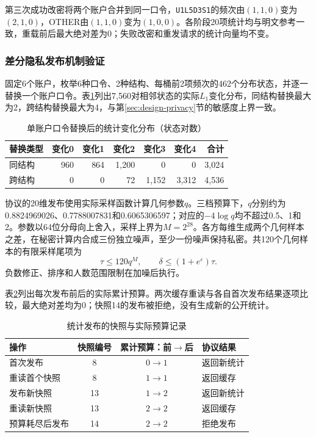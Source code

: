 \documentclass{crypto_report}
\begin{document}
第三次成功改密将两个账户合并到同一口令，\texttt{U1L5D3S1}的频次由$(1,1,0)$变为$(2,1,0)$，OTHER由$(1,1,0)$变为$(1,0,0)$。各阶段20项统计均与明文参考一致，重载前后最大绝对差为0；失败改密和重发请求的统计向量均不变。

\subsubsection{差分隐私发布机制验证}\label{sec:validation-privacy-4}

固定6个账户，枚举6种口令、2种结构、每桶前2项频次的462个分布状态，并逐一替换一个账户口令。表\ref{tab:privacy-sensitivity-values}列出7,560对相邻状态的实际$L_1$变化分布，同结构替换最大为2，跨结构替换最大为4，与第\ref{sec:design-privacy}节的敏感度上界一致。

\begin{table}[H]
\centering
\caption{单账户口令替换后的统计变化分布（状态对数）}\label{tab:privacy-sensitivity-values}
\small
\begin{tabular}{@{}lrrrrrr@{}}
\toprule
替换类型 & 变化0 & 变化1 & 变化2 & 变化3 & 变化4 & 合计 \\
\midrule
同结构 & 960 & 864 & 1,200 & 0 & 0 & 3,024 \\
跨结构 & 0 & 0 & 72 & 1,152 & 3,312 & 4,536 \\
\bottomrule
\end{tabular}
\end{table}

协议的20维发布使用实际采样函数计算几何参数$q$。三档预算下，$q$分别约为0.8824969026、0.7788007831和0.6065306597；对应的$-4\log q$均不超过0.5、1和2。参数以64位分母向上舍入，采样上界为$M=2^{28}$。各方每维生成两个几何样本之差，在秘密计算内合成三份独立噪声，至少一份噪声保持私密。共120个几何样本的有限采样尾项为
\[
\tau\leq120q^M,\qquad \delta\leq(1+e^{\varepsilon})\tau.
\]
负数修正、排序和人数范围限制在加噪后执行。

表\ref{tab:privacy-release-checks}列出每次发布前后的实际累计预算。两次缓存重读与各自首次发布结果逐项比较，最大绝对差均为0；快照14的发布被拒绝，没有生成新的公开统计。

\begin{table}[H]
\centering
\caption{统计发布的快照与实际预算记录}\label{tab:privacy-release-checks}
\small
\begin{tabular}{@{}l c c l@{}}
\toprule
操作 & 快照编号 & 累计预算：前$\rightarrow$后 & 协议结果 \\
\midrule
首次发布 & 8 & $0\rightarrow 1$ & 返回新统计 \\
重读首个快照 & 8 & $1\rightarrow 1$ & 返回缓存 \\
发布新快照 & 13 & $1\rightarrow 2$ & 返回新统计 \\
重读新快照 & 13 & $2\rightarrow 2$ & 返回缓存 \\
预算耗尽后发布 & 14 & $2\rightarrow 2$ & 拒绝发布 \\
\bottomrule
\end{tabular}
\end{table}
\end{document}
